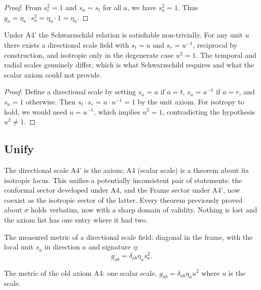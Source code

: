 \begin{proof}
From $s_t^2 = 1$ and $s_a = s_t$ for all $a$, we have $s_a^2 = 1$. Thus $g_a = \eta_a \cdot s_a^2 = \eta_a \cdot 1 = \eta_a$.
\end{proof}

\begin{theorem}
Under A4' the Schwarzschild relation is satisfiable non-trivially. For any unit $u$ there exists a directional scale field with $s_t = u$ and $s_r = u^{-1}$, reciprocal by construction, and isotropic only in the degenerate case $u^2 = 1$. The temporal and radial scales genuinely differ, which is what Schwarzschild requires and what the scalar axiom could not provide. 
\end{theorem}

\begin{proof}
Define a directional scale by setting $s_a = u$ if $a = t$, $s_a = u^{-1}$ if $a = r$, and $s_a = 1$ otherwise. Then $s_t \cdot s_r = u \cdot u^{-1} = 1$ by the unit axiom. For isotropy to hold, we would need $u = u^{-1}$, which implies $u^2 = 1$, contradicting the hypothesis $u^2 \neq 1$.
\end{proof}

\subsection{Unify}

The directional scale A4' is the axiom; A4 (scalar scale) is a theorem about its isotropic locus. This unifies a potentially inconsistent pair of statements: the conformal sector developed under A4, and the Frame sector under A4', now coexist as the isotropic sector of the latter. Every theorem previously proved about $\sigma$ holds verbatim, now with a sharp domain of validity. Nothing is lost and the axiom list has one entry where it had two.

\begin{definition}
The measured metric of a directional scale field: diagonal in the frame, with the local unit $s_a$ in direction $a$ and signature $\eta$:
$$g_{ab} = \delta_{ab} \eta_a s_a^2.$$
\end{definition}

\begin{definition}
The metric of the old axiom A4: one scalar scale, $g_{ab} = \delta_{ab}\eta_a u^2$ where $u$ is the scale. 
\end{definition}

